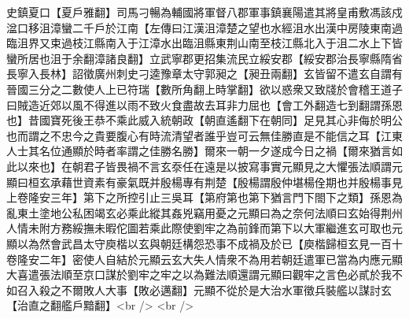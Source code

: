 史鎮夏口【夏戶雅翻】司馬刁暢為輔國將軍督八郡軍事鎮襄陽遣其將皇甫敷馮該戍湓口移沮漳蠻二千戶於江南【左傳曰江漢沮漳楚之望也水經沮水出漢中房陵東南過臨沮界又束過枝江縣南入于江漳水出臨沮縣東荆山南至枝江縣北入于沮二水上下皆蠻所居也沮于余翻漳諸良翻】立武寧郡更招集流民立綏安郡【綏安郡治長寧縣隋省長寧入長林】詔徵廣州刺史刁逵豫章太守郭昶之【昶丑兩翻】玄皆留不遣玄自謂有晉國三分之二數使人上已符瑞【數所角翻上時掌翻】欲以惑衆又致牋於會稽王道子曰賊造近郊以風不得進以雨不致火食盡故去耳非力屈也【會工外翻造七到翻謂孫恩也】昔國寶死後王恭不乘此威入統朝政【朝直遙翻下在朝同】足見其心非侮於明公也而謂之不忠今之貴要腹心有時流清望者誰乎豈可云無佳勝直是不能信之耳【江東人士其名位通顯於時者率謂之佳勝名勝】爾來一朝一夕遂成今日之禍【爾來猶言如此以來也】在朝君子皆畏禍不言玄沗任在遠是以披寫事實元顯見之大懼張法順謂元顯曰桓玄承藉世資素有豪氣既并殷楊專有荆楚【殷楊謂殷仲堪楊佺期也并殷楊事見上卷隆安三年】第下之所控引止三吳耳【第府第也第下猶言門下閤下之類】孫恩為亂東土塗地公私困竭玄必乘此縱其姦兇竊用憂之元顯曰為之奈何法順曰玄始得荆州人情未附方務綏撫未暇佗圖若乘此際使劉牢之為前鋒而第下以大軍繼進玄可取也元顯以為然會武昌太守庾楷以玄與朝廷構怨恐事不成禍及於已【庾楷歸桓玄見一百十卷隆安二年】密使人自結於元顯云玄大失人情衆不為用若朝廷遣軍已當為内應元顯大喜遣張法順至京口謀於劉牢之牢之以為難法順還謂元顯曰觀牢之言色必貳於我不如召入殺之不爾敗人大事【敗必邁翻】元顯不從於是大治水軍徵兵裝艦以謀討玄【治直之翻艦戶黯翻】<br />
<br />
